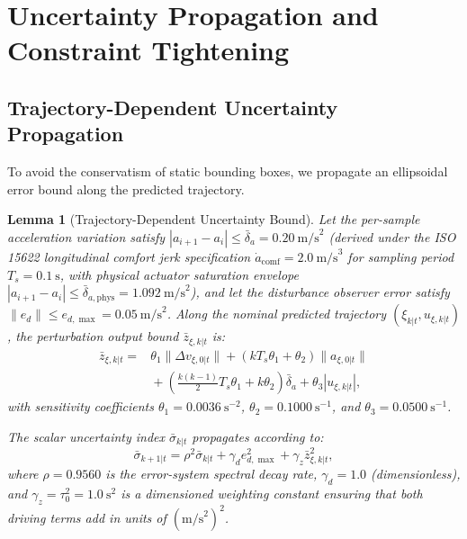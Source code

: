 \documentclass[journal]{IEEEtran}
\newtheorem{lemma}{Lemma}
\begin{document}
\section{Uncertainty Propagation and Constraint Tightening}

\subsection{Trajectory-Dependent Uncertainty Propagation}

To avoid the conservatism of static bounding boxes, we propagate an ellipsoidal error bound along the predicted trajectory.

\begin{lemma}[Trajectory-Dependent Uncertainty Bound]
Let the per-sample acceleration variation satisfy $|a_{i+1} - a_i| \le \bar\delta_a = 0.20~\text{m/s}^2$ (derived under the ISO 15622 longitudinal comfort jerk specification $\dot a_{\mathrm{comf}} = 2.0~\text{m/s}^3$ for sampling period $T_s = 0.1~\text{s}$, with physical actuator saturation envelope $|a_{i+1} - a_i| \le \bar\delta_{a,\mathrm{phys}} = 1.092~\text{m/s}^2$), and let the disturbance observer error satisfy $\|e_d\| \le e_{d,\max} = 0.05~\text{m/s}^2$. Along the nominal predicted trajectory $(\xi_{k|t}, u_{\xi,k|t})$, the perturbation output bound $\bar z_{\xi,k|t}$ is:
\begin{align}
\bar z_{\xi,k|t} ={}& \theta_1 \|\Delta v_{\xi,0|t}\| + (k T_s \theta_1 + \theta_2) \|a_{\xi,0|t}\| \nonumber \\
&{}+ \left(\frac{k(k-1)}{2} T_s \theta_1 + k \theta_2\right) \bar\delta_a + \theta_3 |u_{\xi,k|t}|,
\label{eq:z_bound}
\end{align}
with sensitivity coefficients $\theta_1 = 0.0036~\text{s}^{-2}$, $\theta_2 = 0.1000~\text{s}^{-1}$, and $\theta_3 = 0.0500~\text{s}^{-1}$. 

The scalar uncertainty index $\bar\sigma_{k|t}$ propagates according to:
\begin{equation}
\bar\sigma_{k+1|t} = \rho^2 \bar\sigma_{k|t} + \gamma_d e_{d,\max}^2 + \gamma_z \bar z_{\xi,k|t}^2,
\label{eq:sigma_rec}
\end{equation}
where $\rho = 0.9560$ is the error-system spectral decay rate, $\gamma_d = 1.0$ (dimensionless), and $\gamma_z = \tau_0^2 = 1.0~\text{s}^2$ is a dimensioned weighting constant ensuring that both driving terms add in units of $(\text{m/s}^2)^2$.
\end{lemma}
\end{document}

